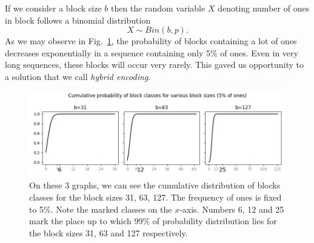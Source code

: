 If we consider a block size $b$ then the random variable $X$ denoting number of ones in
block follows a binomial distribution $$X \sim Bin(b,p).$$ As we may observe in
Fig.~\ref{obr:hybridEncodingDistribution}, the probability of blocks
containing a lot of ones decreases exponentially in a sequence containing only 5\% of ones.
Even in very long sequences, these blocks will occur very rarely. This gaved us
opportunity to a solution that we call \textit{hybrid encoding}.

\begin{figure}
	\centerline{
		\includegraphics[width=\textwidth]{images/hybrid_encoding_motivation}
	}
	\caption[TODO]{On these 3 graphs, we can see the cumulative distribution
    of blocks classes for the block sizes 31, 63, 127. The frequency of ones is
    fixed to 5\%. Note the marked classes on the $x$-axis. Numbers 6, 12 and
    25 mark the place up to which 99\% of probability distribution lies for
    the block sizes 31, 63 and 127 respectively.
	}
	\label{obr:hybridEncodingDistribution}
\end{figure}

